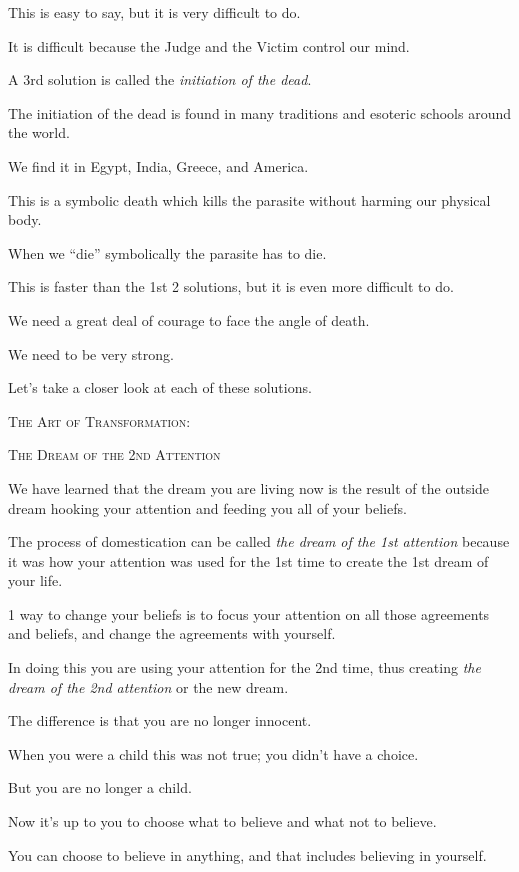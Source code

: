 \documentclass{article}
\numberwithin{equation}{section}
\begin{document}
This is easy to say, but it is very difficult to do.

It is difficult because the Judge and the Victim control our mind.

%
A 3rd solution is called the \textit{initiation of the dead}.

The initiation of the dead is found in many traditions and esoteric schools around the world.

We find it in Egypt, India, Greece, and America.

This is a symbolic death which kills the parasite without harming our physical body.

When we ``die'' symbolically the parasite has to die.

This is faster than the 1st 2 solutions, but it is even more difficult to do.

We need a great deal of courage to face the angle of death.

We need to be very strong.

%
Let's take a closer look at each of these solutions.
\begin{center}
    \textsc{The Art of Transformation:}
    
    \textsc{The Dream of the 2nd Attention}
\end{center}

We have learned that the dream you are living now is the result of the outside dream hooking your attention and feeding you all of your beliefs.

The process of domestication can be called \textit{the dream of the 1st attention} because it was how your attention was used for the 1st time to create the 1st dream of your life.

%
1 way to change your beliefs is to focus your attention on all those agreements and beliefs, and change the agreements with yourself.

In doing this you are using your attention for the 2nd time, thus creating \textit{the dream of the 2nd attention} or the new dream.

%
The difference is that you are no longer innocent.

When you were a child this was not true; you didn't have a choice.

But you are no longer a child.

Now it's up to you to choose what to believe and what not to believe.

You can choose to believe in anything, and that includes believing in yourself.
\end{document}
